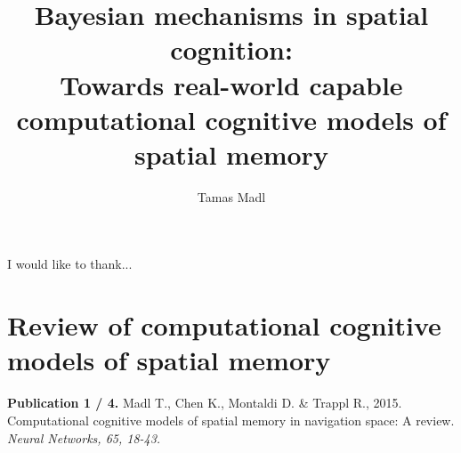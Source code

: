 \documentclass[12pt,PhD,twoside]{muthesis}
\begin{document}

\title{Bayesian mechanisms in spatial cognition:\\
Towards real-world capable computational cognitive models of spatial memory}
\author{Tamas Madl}

\beforeabstract



\afterabstract

I would like to thank...
\afterpreface






 

\chapter{Review of computational cognitive models of spatial memory}
\label{cha:nnreview}

\textbf{Publication 1 / 4.} Madl T., Chen K., Montaldi D. \& Trappl R., 2015. Computational cognitive models of spatial memory in navigation space: A review. \textit{Neural Networks, 65, 18-43.}

\newpage

\addtocounter{page}{-1}


\end{document}
